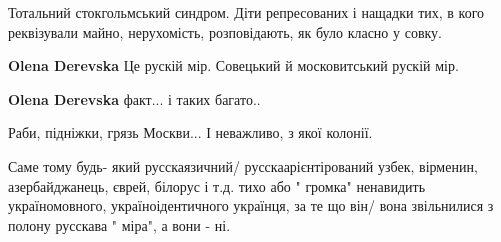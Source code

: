 \begin{itemize}
 

Тотальний стокгольмський синдром. Діти репресованих і нащадки тих, в кого
реквізували майно, нерухомість, розповідають, як було класно у совку.

\begin{itemize}
 
\textbf{Olena Derevska}
Це рускій мір.
Совецький й московитський рускій мір.

 
\textbf{Olena Derevska} факт... і таких багато..

\end{itemize}

 
Раби, підніжки, грязь Москви... І неважливо, з якої колонії.

 

Саме тому будь- який русскаязичний/ русскаарієнтірований узбек, вірменин,
азербайджанець, єврей, білорус і т.д. тихо або " громка" ненавидить
україномовного, україноідентичного українця, за те що він/ вона звільнилися з
полону русскава " міра", а вони - ні.

\begin{itemize}
 

\end{itemize}
\end{itemize}
